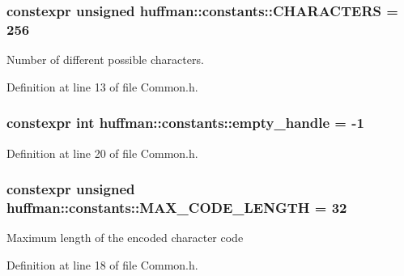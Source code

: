 \subsubsection[{\texorpdfstring{C\+H\+A\+R\+A\+C\+T\+E\+RS}{CHARACTERS}}]{\setlength{\rightskip}{0pt plus 5cm}constexpr unsigned huffman\+::constants\+::\+C\+H\+A\+R\+A\+C\+T\+E\+RS = 256}\hypertarget{namespacehuffman_1_1constants_a263e0c34ff9ba6afe32efbc1eeabdf88}{}\label{namespacehuffman_1_1constants_a263e0c34ff9ba6afe32efbc1eeabdf88}
Number of different possible characters. 

Definition at line 13 of file Common.\+h.

\subsubsection[{\texorpdfstring{empty\+\_\+handle}{empty_handle}}]{\setlength{\rightskip}{0pt plus 5cm}constexpr int huffman\+::constants\+::empty\+\_\+handle = -\/1\hspace{0.3cm}{\ttfamily [static]}}\hypertarget{namespacehuffman_1_1constants_a807803821447a0285e3dfd195ee698e7}{}\label{namespacehuffman_1_1constants_a807803821447a0285e3dfd195ee698e7}


Definition at line 20 of file Common.\+h.

\subsubsection[{\texorpdfstring{M\+A\+X\+\_\+\+C\+O\+D\+E\+\_\+\+L\+E\+N\+G\+TH}{MAX_CODE_LENGTH}}]{\setlength{\rightskip}{0pt plus 5cm}constexpr unsigned huffman\+::constants\+::\+M\+A\+X\+\_\+\+C\+O\+D\+E\+\_\+\+L\+E\+N\+G\+TH = 32}\hypertarget{namespacehuffman_1_1constants_a9bbdd97bbc9095087fd624645d1082fe}{}\label{namespacehuffman_1_1constants_a9bbdd97bbc9095087fd624645d1082fe}
Maximum length of the encoded character code 

Definition at line 18 of file Common.\+h.

